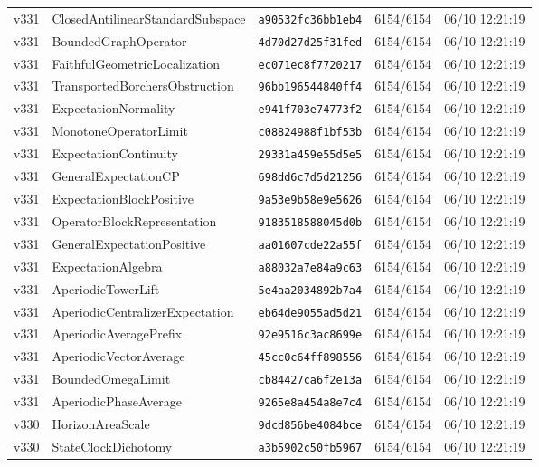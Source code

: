 \documentclass[11pt]{article}
\theoremstyle{definition}\newtheorem{deriv}{Derivation}
\begin{document}
{\begin{longtable}{@{}lllll@{}}
v331 & ClosedAntilinearStandardSubspace & \texttt{a90532fc36bb1eb4} & 6154/6154 & 06/10 12:21:19 \\
v331 & BoundedGraphOperator & \texttt{4d70d27d25f31fed} & 6154/6154 & 06/10 12:21:19 \\
v331 & FaithfulGeometricLocalization & \texttt{ec071ec8f7720217} & 6154/6154 & 06/10 12:21:19 \\
v331 & TransportedBorchersObstruction & \texttt{96bb196544840ff4} & 6154/6154 & 06/10 12:21:19 \\
v331 & ExpectationNormality & \texttt{e941f703e74773f2} & 6154/6154 & 06/10 12:21:19 \\
v331 & MonotoneOperatorLimit & \texttt{c08824988f1bf53b} & 6154/6154 & 06/10 12:21:19 \\
v331 & ExpectationContinuity & \texttt{29331a459e55d5e5} & 6154/6154 & 06/10 12:21:19 \\
v331 & GeneralExpectationCP & \texttt{698dd6c7d5d21256} & 6154/6154 & 06/10 12:21:19 \\
v331 & ExpectationBlockPositive & \texttt{9a53e9b58e9e5626} & 6154/6154 & 06/10 12:21:19 \\
v331 & OperatorBlockRepresentation & \texttt{9183518588045d0b} & 6154/6154 & 06/10 12:21:19 \\
v331 & GeneralExpectationPositive & \texttt{aa01607cde22a55f} & 6154/6154 & 06/10 12:21:19 \\
v331 & ExpectationAlgebra & \texttt{a88032a7e84a9c63} & 6154/6154 & 06/10 12:21:19 \\
v331 & AperiodicTowerLift & \texttt{5e4aa2034892b7a4} & 6154/6154 & 06/10 12:21:19 \\
v331 & AperiodicCentralizerExpectation & \texttt{eb64de9055ad5d21} & 6154/6154 & 06/10 12:21:19 \\
v331 & AperiodicAveragePrefix & \texttt{92e9516c3ac8699e} & 6154/6154 & 06/10 12:21:19 \\
v331 & AperiodicVectorAverage & \texttt{45cc0c64ff898556} & 6154/6154 & 06/10 12:21:19 \\
v331 & BoundedOmegaLimit & \texttt{cb84427ca6f2e13a} & 6154/6154 & 06/10 12:21:19 \\
v331 & AperiodicPhaseAverage & \texttt{9265e8a454a8e7c4} & 6154/6154 & 06/10 12:21:19 \\
v330 & HorizonAreaScale & \texttt{9dcd856be4084bce} & 6154/6154 & 06/10 12:21:19 \\
v330 & StateClockDichotomy & \texttt{a3b5902c50fb5967} & 6154/6154 & 06/10 12:21:19 \\

\end{longtable}}
\end{document}
